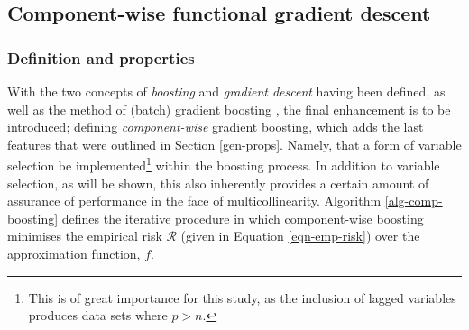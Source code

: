 \documentclass{article}
\begin{document}
\pagebreak


\subsection{Component-wise functional gradient descent \label{comp-boosting}}
\label{sec-5-4}


\subsubsection{Definition and properties \label{comp-alg}}
\label{sec-5-4-1}

With the two concepts of \emph{boosting} and \emph{gradient descent} having been defined, as well as the method of (batch) gradient boosting \cite{friedman2001greedy}, the final enhancement is to be introduced; defining \emph{component-wise} gradient boosting, which adds the last features that were outlined in Section \ref{gen-props}. Namely, that a form of variable selection be implemented\footnote{This is of great importance for this study, as the inclusion of lagged variables produces data sets where $p > n$.} within the boosting process. In addition to variable selection, as will be shown, this also inherently provides a certain amount of assurance of performance in the face of multicollinearity. Algorithm \eqref{alg-comp-boosting} defines the iterative procedure in which component-wise boosting minimises the empirical risk $\mathcal{R}$ (given in Equation \eqref{eqn-emp-risk}) over the approximation function, $f$.

\vspace{5mm}
\end{document}
